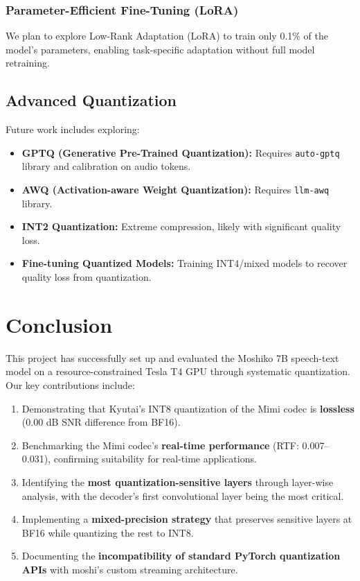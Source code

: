 \documentclass[12pt,a4paper]{report}
\begin{document}
\subsection{Parameter-Efficient Fine-Tuning (LoRA)}
We plan to explore Low-Rank Adaptation (LoRA) to train only 0.1\% of the model's parameters, enabling task-specific adaptation without full model retraining.

\section{Advanced Quantization}
Future work includes exploring:
\begin{itemize}
    \item \textbf{GPTQ (Generative Pre-Trained Quantization):} Requires \texttt{auto-gptq} library and calibration on audio tokens.
    \item \textbf{AWQ (Activation-aware Weight Quantization):} Requires \texttt{llm-awq} library.
    \item \textbf{INT2 Quantization:} Extreme compression, likely with significant quality loss.
    \item \textbf{Fine-tuning Quantized Models:} Training INT4/mixed models to recover quality loss from quantization.
\end{itemize}

\chapter{Conclusion}

This project has successfully set up and evaluated the Moshiko 7B speech-text model on a resource-constrained Tesla T4 GPU through systematic quantization. Our key contributions include:

\begin{enumerate}
    \item Demonstrating that Kyutai's INT8 quantization of the Mimi codec is \textbf{lossless} (0.00 dB SNR difference from BF16).
    \item Benchmarking the Mimi codec's \textbf{real-time performance} (RTF: 0.007--0.031), confirming suitability for real-time applications.
    \item Identifying the \textbf{most quantization-sensitive layers} through layer-wise analysis, with the decoder's first convolutional layer being the most critical.
    \item Implementing a \textbf{mixed-precision strategy} that preserves sensitive layers at BF16 while quantizing the rest to INT8.
    \item Documenting the \textbf{incompatibility of standard PyTorch quantization APIs} with moshi's custom streaming architecture.
\end{enumerate}
\end{document}

